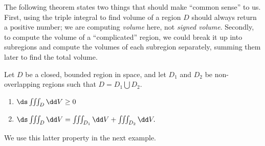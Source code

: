 The following theorem states two things that should make ``common sense'' to us. First, using the triple integral to find volume of a region $D$ should always return a positive number; we are computing \emph{volume} here, not \emph{signed volume}. Secondly, to compute the volume of a ``complicated'' region, we could break it up into subregions and compute the volumes of each subregion separately, summing them later to find the total volume.

\begin{theorem}\label{thm:triple_int_prop}%
Let $D$ be a closed, bounded region in space, and let $D_1$ and $D_2$ be non-overlapping regions such that $D=D_1\bigcup D_2$.
\begin{enumerate}
	\item $\ds \iiint_D \dd V \geq 0$
	\item	$\ds \iiint_D\dd V = \iiint_{D_1}\dd V + \iiint_{D_2}\dd V.$
\end{enumerate}
\end{theorem}

We use this latter property in the next example.

